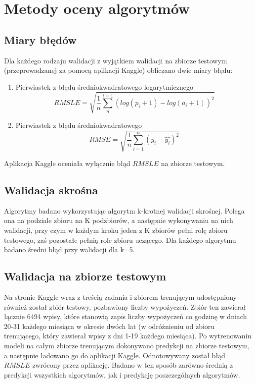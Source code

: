 \documentclass[a4paper,12pt]{article}
\begin{document}
\section{Metody oceny algorytmów}

    \subsection{Miary błędów}
    Dla każdego rodzaju walidacji z wyjątkiem walidacji na zbiorze testowym (przeprowadzanej za pomocą aplikacji Kaggle) obliczano dwie miary błędu:
    \begin{enumerate}
        \item Pierwiastek z błędu średniokwadratowego logarytmicznego $$RMSLE = \sqrt{\frac{1}{n}\sum_{n}^{i=1}(log(p_i + 1) - log(a_i + 1))^2}$$

        \item Pierwiastek z błędu średniokwadratowego $$RMSE = \sqrt{\frac{1}{n}\sum_{i=1}^{n}(y_i - \hat{y_i})^2}$$
     \end{enumerate}
    Aplikacja Kaggle oceniała wyłącznie błąd $RMSLE$ na zbiorze testowym.
    
    \subsection{Walidacja skrośna}
    Algorytmy badano wykorzystując algorytm k-krotnej walidacji skrośnej. Polega ona na podziale zbioru na K podzbiorów, a następnie wykonywaniu na nich 
    walidacji, przy czym w każdym kroku jeden z K zbiorów pełni rolę zbioru testowego, zaś pozostałe pełnią role zbioru uczącego. Dla każdego algorytmu 
    badano średni błąd przy walidacji dla k=5.
    \subsection{Walidacja na zbiorze testowym}       
    Na stronie Kaggle wraz z treścią zadania i zbiorem trenującym udostępniony również został zbiór testowy, pozbawiony liczby wypożyczeń. 
    Zbiór ten zawierał łącznie 6494 wpisy, które stanowią zapis liczby wypożyczeń co godzinę w dniach 20-31 każdego miesiąca w okresie dwóch lat
    (w odróżnieniu od zbioru trenującego, który zawierał wpisy z dni 1-19 każdego miesiąca).
    Po wytrenowaniu
    modeli na całym zbiorze trenującym dokonywano predykcji na zbiorze testowym, a następnie ładowano go do aplikacji Kaggle. Odnotowywany został błąd 
    $RMSLE$ zwrócony przez aplikację. Badano w ten sposób zarówno średnią z predykcji wszystkich algorytmów, jak i predykcję poszczególnych algorytmów.
    
\end{document}
